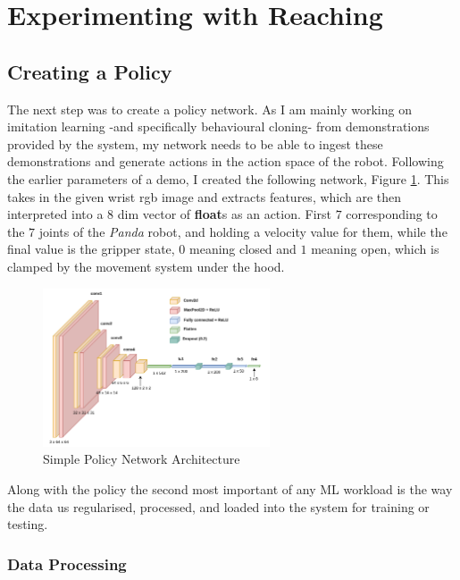 \section{Experimenting with Reaching}

\subsection{Creating a Policy}
The next step was to create a policy network. As I am mainly working on imitation learning -and specifically behavioural cloning- from demonstrations provided by the system, my network needs to be able to ingest these demonstrations and generate actions in the action space of the robot. Following the earlier parameters of a demo, I created the following network, Figure \ref{fig:policy-arch}. This takes in the given wrist rgb image and extracts features, which are then interpreted into a $8$ dim vector of \textbf{float}s as an action. First $7$ corresponding to the $7$ joints of the \emph{Panda} robot, and holding a velocity value for them, while the final value is the gripper state, $0$ meaning closed and $1$ meaning open, which is clamped by the movement system under the hood.

\begin{figure}[h]
  \centering
  \includegraphics[width=0.6\textwidth]{assets/early-work/cnn-encoder-policy-head.png}
  \caption{Simple Policy Network Architecture}\label{fig:policy-arch}
\end{figure}

Along with the policy the second most important of any ML workload is the way the data us regularised, processed, and loaded into the system for training or testing.

\subsubsection{Data Processing}

